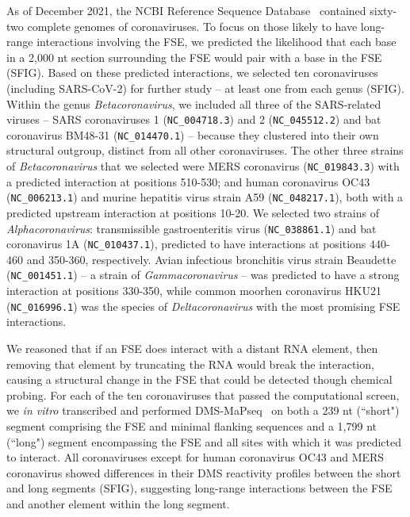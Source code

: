 \documentclass[main.tex]{subfiles}
\begin{document}
As of December 2021, the NCBI Reference Sequence Database~\cite{OLeary2016} contained sixty-two complete genomes of coronaviruses.
To focus on those likely to have long-range interactions involving the FSE, we predicted the likelihood that each base in a 2,000 nt section surrounding the FSE would pair with a base in the FSE (SFIG).
Based on these predicted interactions, we selected ten coronaviruses (including SARS-CoV-2) for further study -- at least one from each genus (SFIG).
Within the genus \textit{Betacoronavirus}, we included all three of the SARS-related viruses -- SARS coronaviruses 1 (\verb|NC_004718.3|) and 2 (\verb|NC_045512.2|) and bat coronavirus BM48-31 (\verb|NC_014470.1|) -- because they clustered into their own structural outgroup, distinct from all other coronaviruses.
The other three strains of \textit{Betacoronavirus} that we selected were MERS coronavirus (\verb|NC_019843.3|) with a predicted interaction at positions 510-530; and human coronavirus OC43 (\verb|NC_006213.1|) and murine hepatitis virus strain A59 (\verb|NC_048217.1|), both with a predicted upstream interaction at positions 10-20.
We selected two strains of \textit{Alphacoronavirus}: transmissible gastroenteritis virus (\verb|NC_038861.1|) and bat coronavirus 1A (\verb|NC_010437.1|), predicted to have interactions at positions 440-460 and 350-360, respectively.
Avian infectious bronchitis virus strain Beaudette (\verb|NC_001451.1|) -- a strain of \textit{Gammacoronavirus} -- was predicted to have a strong interaction at positions 330-350, while common moorhen coronavirus HKU21 (\verb|NC_016996.1|) was the species of \textit{Deltacoronavirus} with the most promising FSE interactions.

We reasoned that if an FSE does interact with a distant RNA element, then removing that element by truncating the RNA would break the interaction, causing a structural change in the FSE that could be detected though chemical probing.
For each of the ten coronaviruses that passed the computational screen, we \textit{in vitro} transcribed and performed DMS-MaPseq~\cite{Zubradt2016} on both a 239 nt (``short") segment comprising the FSE and minimal flanking sequences and a 1,799 nt (``long") segment encompassing the FSE and all sites with which it was predicted to interact.
All coronaviruses except for human coronavirus OC43 and MERS coronavirus showed differences in their DMS reactivity profiles between the short and long segments (SFIG), suggesting long-range interactions between the FSE and another element within the long segment.
\end{document}
